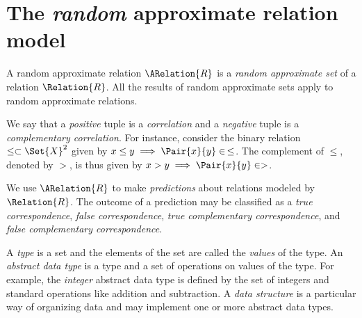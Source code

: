 \documentclass[ ../main.tex]{subfiles}
\begin{document}
\section{The \emph{random} approximate relation model}
A random approximate relation $\ARelation{R}$ is a \emph{random approximate set}\cite{aset} of a relation $\Relation{R}$.
All the results of random approximate sets apply to random approximate relations.

We say that a \emph{positive} tuple is a \emph{correlation} and a \emph{negative} tuple is a \emph{complementary correlation}.
For instance, consider the binary relation $\leq \subset \Set{X}^2$ given by $x \leq y \implies \Pair{x}{y} \in \, \leq$.
The complement of $\leq$, denoted by $>$, is thus given by $x > y \implies \Pair{x}{y} \in >$.

We use $\ARelation{R}$ to make \emph{predictions} about relations modeled by $\Relation{R}$.
The outcome of a prediction may be classified as a \emph{true correspondence}, \emph{false correspondence}, \emph{true complementary correspondence}, and \emph{false complementary correspondence}.

A \emph{type} is a set and the elements of the set are called the \emph{values} of the type.
An \emph{abstract data type} is a type and a set of operations on values of the type.
For example, the \emph{integer} abstract data type is defined by the set of integers and standard operations like addition and subtraction.
A \emph{data structure} is a particular way of organizing data and may implement one or more abstract data types.
\end{document}
